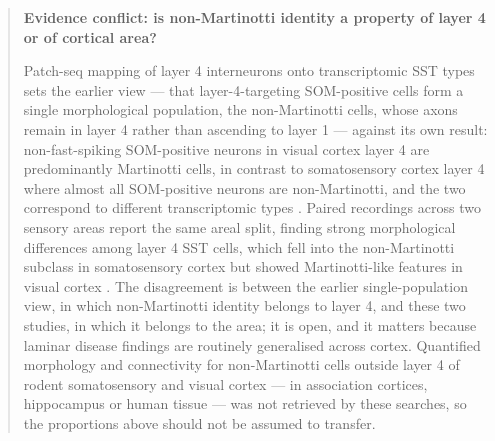 \documentclass[11pt]{article}
\begin{document}
\begin{quote}
\noindent\textbf{Evidence conflict: is non-Martinotti identity a property of layer 4 or of cortical area?}\par
Patch-seq mapping of layer 4 interneurons onto transcriptomic SST types sets the earlier view --- that layer-4-targeting SOM-positive cells form a single morphological population, the non-Martinotti cells, whose axons remain in layer 4 rather than ascending to layer 1 --- against its own result: non-fast-spiking SOM-positive neurons in visual cortex layer 4 are predominantly Martinotti cells, in contrast to somatosensory cortex layer 4 where almost all SOM-positive neurons are non-Martinotti, and the two correspond to different transcriptomic types \citep{Scala2019}. Paired recordings across two sensory areas report the same areal split, finding strong morphological differences among layer 4 SST cells, which fell into the non-Martinotti subclass in somatosensory cortex but showed Martinotti-like features in visual cortex \citep{Rachel2025}. The disagreement is between the earlier single-population view, in which non-Martinotti identity belongs to layer 4, and these two studies, in which it belongs to the area; it is open, and it matters because laminar disease findings are routinely generalised across cortex. Quantified morphology and connectivity for non-Martinotti cells outside layer 4 of rodent somatosensory and visual cortex --- in association cortices, hippocampus or human tissue --- was not retrieved by these searches, so the proportions above should not be assumed to transfer.

\end{quote}
\end{document}

